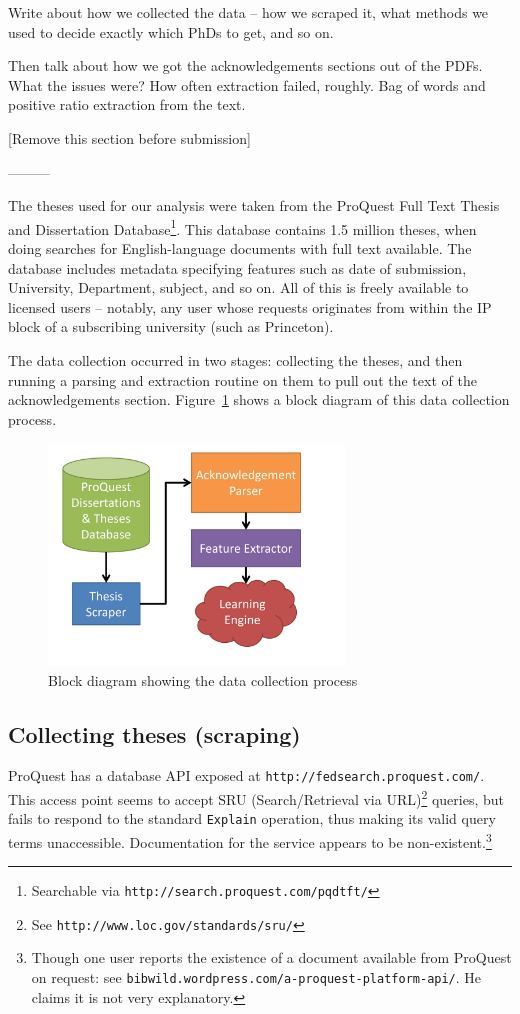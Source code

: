 Write about how we collected the data -- how we scraped it, what methods we used to decide exactly which PhDs to get, and so on.

Then talk about how we got the acknowledgements sections out of the PDFs. What the issues were? How often extraction failed, roughly. Bag of words and positive ratio extraction from the text.

[Remove this section before submission]

---------

The theses used for our analysis were taken from the ProQuest Full Text Thesis and Dissertation Database\footnote{Searchable via \texttt{http://search.proquest.com/pqdtft/}}. This database contains 1.5 million theses, when doing searches for English-language documents with full text available. The database includes metadata specifying features such as date of submission, University, Department, subject, and so on. All of this is freely available to licensed users -- notably, any user whose requests originates from within the IP block of a subscribing university (such as Princeton).

The data collection occurred in two stages: collecting the theses, and then running a parsing and extraction routine on them to pull out the text of the acknowledgements section.  Figure~\ref{fig:data_collect_block_diagram} shows a block diagram of this data collection process.

\begin{figure}
	\centering
	\includegraphics[width=0.7\textwidth]{block_diagram}
	\caption{Block diagram showing the data collection process}
	\label{fig:data_collect_block_diagram}
\end{figure}

\subsection*{Collecting theses (scraping)}
ProQuest has a database API exposed at \texttt{http://fedsearch.proquest.com/}. This access point seems to accept SRU (Search/Retrieval via URL)\footnote{See \texttt{http://www.loc.gov/standards/sru/}} queries, but fails to respond to the standard \texttt{Explain} operation, thus making its valid query terms unaccessible. Documentation for the service appears to be non-existent.\footnote{Though one user reports the existence of a document available from ProQuest on request: see \texttt{bibwild.wordpress.com/a-proquest-platform-api/}. He claims it is not very explanatory.}

